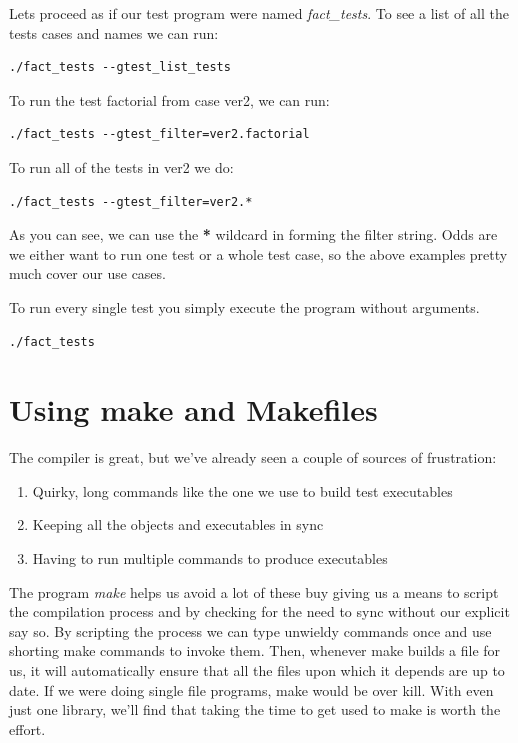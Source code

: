 \documentclass[]{tufte-handout}
\begin{document}
Lets proceed as if our test program were named \textit{fact\_tests}. To see a list of all the tests cases and names we can run:
\begin{verbatim} 
./fact_tests --gtest_list_tests
\end{verbatim}
To run the test factorial from case ver2, we can run:
\begin{verbatim}
./fact_tests --gtest_filter=ver2.factorial
\end{verbatim}
To run all of the tests in ver2 we do:
\begin{verbatim}
./fact_tests --gtest_filter=ver2.*
\end{verbatim}
As you can see, we can use the \textbf{*} wildcard in forming the filter string. Odds are we either want to run one test or a whole test case, so the above examples pretty much cover our use cases.

To run every single test you simply execute the program without arguments.
\begin{verbatim}
./fact_tests
\end{verbatim}

\section{Using make and Makefiles}

The compiler is great, but we've already seen a couple of sources of frustration:
\begin{enumerate}
\item Quirky, long commands like the one we use to build test executables
\item Keeping all the objects and executables in sync
\item Having to run multiple commands to produce executables 
\end{enumerate}
The program \textit{make} helps us avoid a lot of these buy giving us a means to script the compilation process and by checking for the need to sync without our explicit say so. By scripting the process we can type unwieldy commands once and use shorting make commands to invoke them.  Then, whenever make builds a file for us, it will automatically ensure that all the files upon which it depends are up to date. If we were doing single file programs, make would be over kill. With even just one library, we'll find that taking the time to get used to make is worth the effort.
\end{document}
